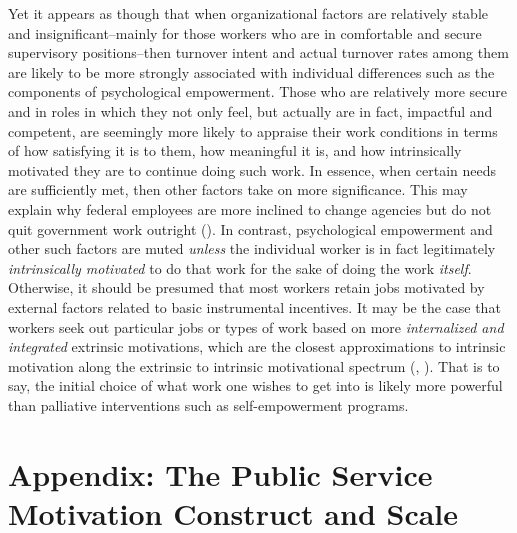 \documentclass[
  11pt,
  a4paper,
]{article}
\begin{document}
Yet it appears as though that when organizational factors are relatively
stable and insignificant--mainly for those workers who are in
comfortable and secure supervisory positions--then turnover intent and
actual turnover rates among them are likely to be more strongly
associated with individual differences such as the components of
psychological empowerment. Those who are relatively more secure and in
roles in which they not only feel, but actually are in fact, impactful
and competent, are seemingly more likely to appraise their work
conditions in terms of how satisfying it is to them, how meaningful it
is, and how intrinsically motivated they are to continue doing such
work. In essence, when certain needs are sufficiently met, then other
factors take on more significance. This may explain why federal
employees are more inclined to change agencies but do not quit
government work outright ().
In contrast, psychological empowerment and other such factors are muted
\emph{unless} the individual worker is in fact legitimately
\emph{intrinsically motivated} to do that work for the sake of doing the
work \emph{itself}. Otherwise, it should be presumed that most workers
retain jobs motivated by external factors related to basic instrumental
incentives. It may be the case that workers seek out particular jobs or
types of work based on more \emph{internalized and integrated} extrinsic
motivations, which are the closest approximations to intrinsic
motivation along the extrinsic to intrinsic motivational spectrum
(,
). That is to say, the initial choice of
what work one wishes to get into is likely more powerful than palliative
interventions such as self-empowerment programs.

\newpage

\section{Appendix: The Public Service Motivation Construct and
Scale}\label{appendix-the-public-service-motivation-construct-and-scale}
\end{document}
